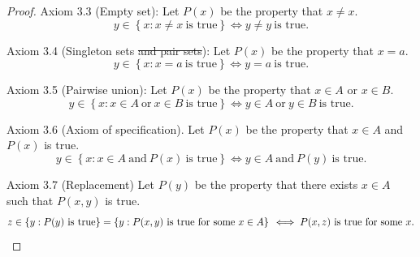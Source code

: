 \documentclass{article}
\begin{document}
\begin{proof}
    Axiom 3.3 (Empty set):
    Let $P(x)$ be the property that $x\neq x$.
    \[
        y\in\left\{x:x\neq x\ \textrm{is true}\right\}\iff y\neq y\ \textrm{is true}.
    \]

    Axiom 3.4 (Singleton sets \st{and pair sets}):
    Let $P(x)$ be the property that $x=a$.
    \[
        y\in\left\{x:x=a\ \textrm{is true}\right\}\iff y=a\ \textrm{is true}.
    \]

    Axiom 3.5 (Pairwise union):
    Let $P(x)$ be the property that $x\in A$ or $x\in B$.
    \[
        y\in\left\{x:x\in A\ \textrm{or}\ x\in B\ \textrm{is true}\right\}\iff y\in A\ \textrm{or}\ y\in B\ \textrm{is true}.
    \]

    Axiom 3.6 (Axiom of specification). Let $P(x)$ be the property that $x\in A$ and $P(x)$ is true.
    \[
        y\in\left\{x:x\in A\ \textrm{and}\ P(x)\ \textrm{is true}\right\}\iff y\in A\ \textrm{and}\ P(y)\ \textrm{is true}.
    \]

    Axiom 3.7 (Replacement) Let $P(y)$ be the property that there exists $x\in A$ such that $P(x,y)$ is true.
    \[
        z\in\left\{y:P(y)\ \textrm{is true}\right\}=\left\{y:P(x,y)\ \textrm{is true}\ \textrm{for some}\ x\in A\right\}\\
        \iff P(x,z)\ \textrm{is true}\ \textrm{for some}\ x.
    \]
\end{proof}
\end{document}

